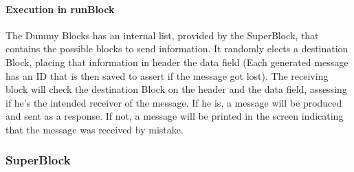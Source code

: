 \begin{refsection}
\paragraph{Execution in runBlock}

The Dummy Blocks has an internal list, provided by the SuperBlock, that contains 
the possible blocks to send information. It randomly elects a destination Block, 
placing that information in header the data field (Each generated message has an 
ID that is then saved to assert if the message got lost). The receiving block 
will check the destination Block on the header and the data field, assessing if 
he's the intended receiver of the message. If he is, a message will be produced 
and sent as a response. If not, a message will be printed in the screen indicating 
that the message was received by mistake.

\subsubsection{SuperBlock}


\end{refsection}
